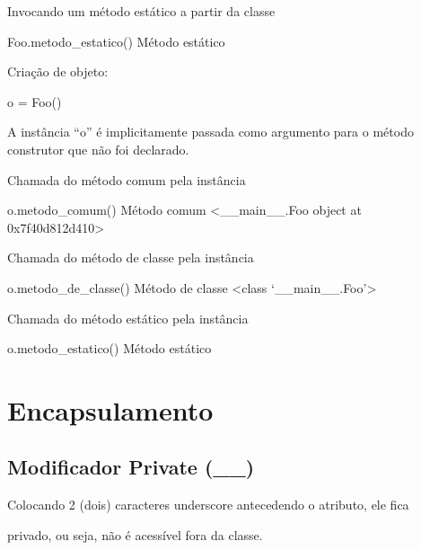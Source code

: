 \documentclass[letterpaper,10pt,brazil]{sphinxmanual}
\begin{document}
Invocando um método estático a partir da classe

Foo.metodo\_estatico()
Método estático

Criação de objeto:

o = Foo()

A instância “o” é implicitamente passada como argumento para o método construtor que não foi declarado.

Chamada do método comum pela instância

o.metodo\_comum()
Método comum \textless{}\_\_main\_\_.Foo object at 0x7f40d812d410\textgreater{}

Chamada do método de classe pela instância

o.metodo\_de\_classe()
Método de classe \textless{}class ‘\_\_main\_\_.Foo’\textgreater{}

Chamada do método estático pela instância

o.metodo\_estatico()
Método estático


\chapter{Encapsulamento}
\label{\detokenize{content/property:encapsulamento}}\label{\detokenize{content/property::doc}}

\section{Modificador Private (\_\_)}
\label{\detokenize{content/property:modificador-private}}
\begin{DUlineblock}{0em}
\item[]
\begin{DUlineblock}{\DUlineblockindent}
\item[] Colocando 2 (dois) caracteres underscore antecedendo o atributo, ele fica
\end{DUlineblock}
\item[] privado, ou seja, não é acessível fora da classe.
\end{DUlineblock}

\begin{sphinxVerbatim}[commandchars=\\\{\}]
 
      

  

\end{sphinxVerbatim}
\end{document}
